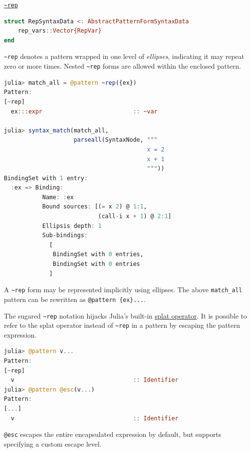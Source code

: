 \documentclass{juliacon}
\begin{document}
\vspace{0.2cm}
\label{orge098f9d}\vspace{0.2cm}
\underline{\texttt{\textasciitilde{}rep}}

\begin{lstlisting}[language=Julia]
struct RepSyntaxData <: AbstractPatternFormSyntaxData
    rep_vars::Vector{RepVar}
end
\end{lstlisting}

\texttt{\textasciitilde{}rep} denotes a pattern wrapped in one level of \emph{ellipses},
indicating it may repeat zero or more times. Nested \texttt{\textasciitilde{}rep} forms are
allowed within the enclosed pattern.

\begin{lstlisting}[language=Julia]
julia> match_all = @pattern ~rep({ex})
Pattern:
[~rep]
  ex:::expr                          :: ~var

julia> syntax_match(match_all,
                    parseall(SyntaxNode, """
                                         x = 2
                                         x + 1
                                         """))
BindingSet with 1 entry:
  :ex => Binding:
           Name: :ex
           Bound sources: [(= x 2) @ 1:1,
                           (call-i x + 1) @ 2:1]
           Ellipsis depth: 1
           Sub-bindings:
             [
              BindingSet with 0 entries,
              BindingSet with 0 entries
             ]
\end{lstlisting}

A \texttt{\textasciitilde{}rep} form may be represented implicitly using ellipses. The above
\texttt{match\_all} pattern can be rewritten as \texttt{@pattern \{ex\}...}.

The sugared \texttt{\textasciitilde{}rep} notation hijacks Julia's built-in \href{https://docs.julialang.org/en/v1/base/base/\#...}{splat
operator}. It is possible to refer to the splat operator instead of
\texttt{\textasciitilde{}rep} in a pattern by escaping the pattern expression.

\begin{lstlisting}[language=julia]
julia> @pattern v...
Pattern:
[~rep]
  v                                  :: Identifier
julia> @pattern @esc(v...)
Pattern:
[...]
  v                                  :: Identifier
\end{lstlisting}

\texttt{@esc} escapes the entire encapsulated expression by default, but
supports specifying a custom escape level.
\end{document}
